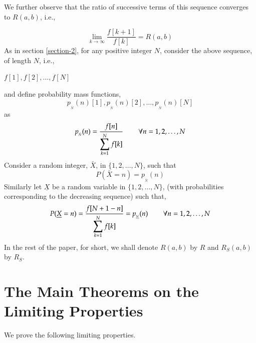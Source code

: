 \begin{multicols}{2}
\vspace{-.6cm}

We further observe that the ratio of successive terms of this sequence converges to $R(a,b)$, i.e.,

\vspace{-.3cm}

\begin{equation}
\lim_{k \rightarrow \infty} \frac{f[k+1]}{f[k]} = R(a,b)\label{eq-3.5}
\end{equation}
As in section \ref{section-2}, for any positive integer $N$, consider the above sequence, of length $N$, i.e.,
\begin{center}
$f[1],f[2], \ldots, f[N]$
\end{center} 

\vspace{-.3cm}

and define probability mass functions,
$$
p_{_{\bar{N}}}(n)[1],p_{_{\bar{N}}}(n)[2], \ldots, p_{_{\bar{N}}}(n)[N]
$$
as
\begin{equation}
 p_{_{\bar{N}}}(n) = \frac{f[n]}{\displaystyle{\sum_{k =1}^N f[k]}} \hspace{0.3in} \forall n = 1, 2, \ldots, N\label{eq-3.6}
\end{equation}
Consider a random integer, $\bar{X}$, in $\{1,2, \ldots, N\}$, such that
\begin{equation}
P(\bar{X} = n) = p_{_{\bar{N}}}(n)\label{eq-3.7}
\end{equation} 
Similarly let $\underline{X}$ be a random variable in $\{1,2, \ldots, N\}$, (with probabilities corresponding to the decreasing sequence) such that, 
\begin{equation}
P(\underline{X} = n) = \frac{f[N+1-n]}{\displaystyle{\sum_{k =1}^N f[k]}} = p_{_{\underline{N}}}(n) \hspace{0.3in} \forall n = 1, 2, \ldots, N\label{eq-3.8}
\end{equation} 
 In the rest of the paper, for short, we shall denote $R(a,b)$ by $R$ and $R_S(a,b)$ by $R_S$.
 
 \vspace{-.2cm}
 
\section{The Main Theorems on the\\ Limiting Properties}\label{section-4} 

We prove the following limiting properties.


\end{multicols}
